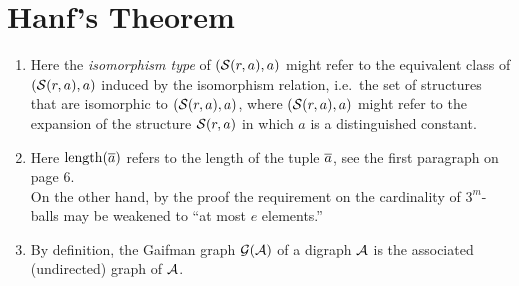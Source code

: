 \section{Hanf's Theorem}
\begin{enumerate}[1.]
%
\item {} Here the \emph{isomorphism type} of $(\ballstrct{r, a}, a)$ might refer to the equivalent class of $(\ballstrct{r, a}, a)$ induced by the isomorphism relation, i.e.\ the set of structures that are isomorphic to $(\ballstrct{r, a}, a)$, where $(\ballstrct{r, a}, a)$ might refer to the expansion of the structure $\ballstrct{r, a}$ in which $a$ is a distinguished constant.
%
\item {} Here ${\mathrm{length}(\overline{a})}$ refers to the length of the tuple $\overline{a}$, see the first paragraph on page 6.
\medskip\\
On the other hand, by the proof the requirement on the cardinality of $3^m$-balls may be weakened to ``at most $e$ elements.''
%
\item {} By definition, the Gaifman graph ${\mathcal{G}(\mathcal{A})}$ of a digraph $\mathcal{A}$ is the associated (undirected) graph of $\mathcal{A}$.
%
\end{enumerate}
